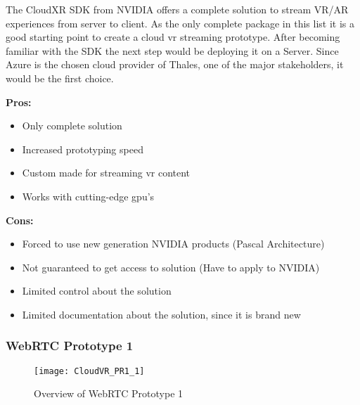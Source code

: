 The CloudXR SDK from NVIDIA offers a complete solution to stream VR/AR experiences from server to client. As the only complete package in this list it is a good starting point to create a cloud \acrshort{vr} streaming prototype. After becoming familiar with the SDK the next step would be deploying it on a Server. Since Azure is the chosen cloud provider of Thales, one of the major stakeholders, it would be the first choice. \\
\newline
\begin{varwidth}[t]{.5\textwidth}
\renewcommand\labelitemi{+}
\textbf{Pros:}
\begin{itemize}
\item Only complete solution
\item Increased prototyping speed
\item Custom made for streaming \acrshort{vr} content
\item Works with cutting-edge \acrshort{gpu}'s
\end{itemize}
\end{varwidth}
\hspace{4em}
\begin{varwidth}[t]{.5\textwidth}
\renewcommand\labelitemi{-}
\textbf{Cons:}
\begin{itemize}
\item Forced to use new generation NVIDIA products (Pascal Architecture)
\item Not guaranteed to get access to solution (Have to apply to NVIDIA)
\item Limited control about the solution
\item Limited documentation about the solution, since it is brand new
\end{itemize}
\end{varwidth}

\subsubsection{WebRTC Prototype 1}
\begin{figure}[h!]
\caption{Overview of WebRTC Prototype 1}
\label{fig:pr11}
\texttt{[image: CloudVR\_PR1\_1]}
\end{figure}


